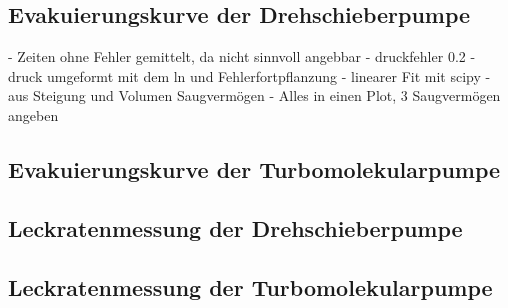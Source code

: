\subsection{Evakuierungskurve der Drehschieberpumpe}
\label{sec:AuswEvaD}

- Zeiten ohne Fehler gemittelt, da nicht sinnvoll angebbar
- druckfehler 0.2
- druck umgeformt mit dem ln und Fehlerfortpflanzung
- linearer Fit mit scipy
- aus Steigung und Volumen Saugvermögen
- Alles in einen Plot, 3 Saugvermögen angeben


\subsection{Evakuierungskurve der Turbomolekularpumpe}
\label{sec:AuswEvaT}

\subsection{Leckratenmessung der Drehschieberpumpe}
\label{sec:AuswLeckD}

\subsection{Leckratenmessung der Turbomolekularpumpe}
\label{sec:AuswLeckT}

